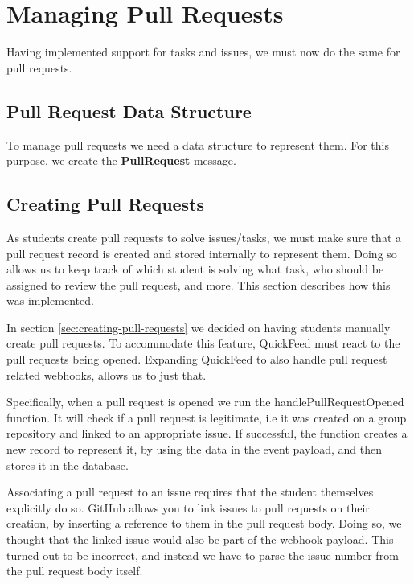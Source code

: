 \section{Managing Pull Requests}

Having implemented support for tasks and issues, we must now do the same for pull requests.

\subsection{Pull Request Data Structure}

To manage pull requests we need a data structure to represent them.
For this purpose, we create the \textbf{PullRequest} message.



\subsection{Creating Pull Requests}

As students create pull requests to solve issues/tasks, we must make sure that a pull request record is created and stored internally to represent them.
Doing so allows us to keep track of which student is solving what task, who should be assigned to review the pull request, and more.
This section describes how this was implemented.

In section \ref{sec:creating-pull-requests} we decided on having students manually create pull requests.
To accommodate this feature, QuickFeed must react to the pull requests being opened.
Expanding QuickFeed to also handle pull request related webhooks, allows us to just that.

Specifically, when a pull request is opened we run the handlePullRequestOpened function.
It will check if a pull request is legitimate, i.e it was created on a group repository and linked to an appropriate issue.
If successful, the function creates a new record to represent it, by using the data in the event payload, and then stores it in the database.

Associating a pull request to an issue requires that the student themselves explicitly do so.
GitHub allows you to link issues to pull requests on their creation, by inserting a reference to them in the pull request body.
Doing so, we thought that the linked issue would also be part of the webhook payload.
This turned out to be incorrect, and instead we have to parse the issue number from the pull request body itself.

